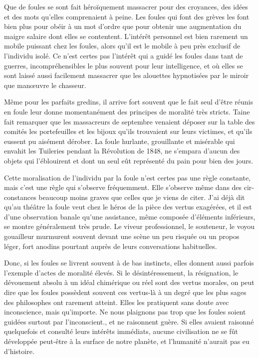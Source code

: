 \documentclass[french,twoside]{book} %
\begin{document}
Que de foules se sont fait héroïquement massacrer pour des croyances, des idées et des mots qu’elles comprenaient à peine. Les foules qui font des grèves les font bien plus pour obéir à un mot d’ordre que pour obtenir une augmentation du maigre salaire dont elles se contentent. L’intérêt personnel est bien rarement un mobile puissant chez les foules, alors qu’il est le mobile à peu près exclusif de l’individu isolé. Ce n’est certes pas l’intérêt qui a guidé les foules dans tant de guerres, incompréhensibles le plus souvent pour leur intelligence, et où elles se sont laissé aussi facilement massa­crer que les alouettes hypnotisées par le miroir que manœuvre le chasseur.\par
Même pour les parfaits gredins, il arrive fort souvent que le fait seul d’être réunis en foule leur donne momentanément des principes de moralité très stricts. Taine fait remarquer que les massacreurs de septembre venaient déposer sur la table des comités les portefeuilles et les bijoux qu’ils trouvaient sur leurs victimes, et qu’ils eussent pu aisément dérober. La foule hurlante, grouillante et misérable qui envahit les Tuileries pendant la Révolution de 1848, ne s’empara d’aucun des objets qui l’éblouirent et dont un seul eût représenté du pain pour bien des jours.\par
Cette moralisation de l’individu par la foule n’est certes pas une règle constante, mais c’est une règle qui s’observe fréquemment. Elle s’observe même dans des cir­constances beaucoup moins graves que celles que je viens de citer. J’ai déjà dit qu’au théâtre la foule veut chez le héros de la pièce des vertus exagérées, et il est d’une ob­servation banale qu’une assistance, même composée d’éléments inférieurs, se montre généralement très prude. Le viveur professionnel, le souteneur, le voyou gouailleur murmurent souvent devant une scène un peu risquée ou un propos léger, fort anodins pourtant auprès de leurs conversations habituelles.\par
Donc, si les foules se livrent souvent à de bas instincts, elles donnent aussi parfois l’exemple d’actes de moralité élevés. Si le désintéressement, la résignation, le dévoue­ment absolu à un idéal chimérique ou réel sont des vertus morales, on peut dire que les foules possèdent souvent ces vertus-là à un degré que les plus sages des philoso­phes ont rarement atteint. Elles les pratiquent sans doute avec inconscience, mais qu’importe. Ne nous plaignons pas trop que les foules soient guidées surtout par l’in­conscient., et ne raisonnent guère. Si elles avaient raisonné quelquefois et consulté leurs intérêts immédiats, aucune civilisation ne se fût développée peut-être à la sur­face de notre planète, et l’humanité n’aurait pas eu d’histoire.\par
\end{document}
